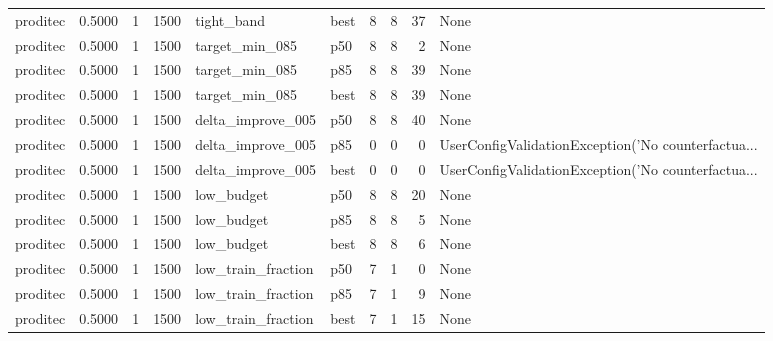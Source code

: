 \begin{tabular}{lrrrllrrrl}
proditec &    0.5000 &    1 &   1500 &           tight\_band &   best &               8 &          8 &      37 &                                               None \\
proditec &    0.5000 &    1 &   1500 &       target\_min\_085 &    p50 &               8 &          8 &       2 &                                               None \\
proditec &    0.5000 &    1 &   1500 &       target\_min\_085 &    p85 &               8 &          8 &      39 &                                               None \\
proditec &    0.5000 &    1 &   1500 &       target\_min\_085 &   best &               8 &          8 &      39 &                                               None \\
proditec &    0.5000 &    1 &   1500 &    delta\_improve\_005 &    p50 &               8 &          8 &      40 &                                               None \\
proditec &    0.5000 &    1 &   1500 &    delta\_improve\_005 &    p85 &               0 &          0 &       0 & UserConfigValidationException('No counterfactua... \\
proditec &    0.5000 &    1 &   1500 &    delta\_improve\_005 &   best &               0 &          0 &       0 & UserConfigValidationException('No counterfactua... \\
proditec &    0.5000 &    1 &   1500 &           low\_budget &    p50 &               8 &          8 &      20 &                                               None \\
proditec &    0.5000 &    1 &   1500 &           low\_budget &    p85 &               8 &          8 &       5 &                                               None \\
proditec &    0.5000 &    1 &   1500 &           low\_budget &   best &               8 &          8 &       6 &                                               None \\
proditec &    0.5000 &    1 &   1500 &   low\_train\_fraction &    p50 &               7 &          1 &       0 &                                               None \\
proditec &    0.5000 &    1 &   1500 &   low\_train\_fraction &    p85 &               7 &          1 &       9 &                                               None \\
proditec &    0.5000 &    1 &   1500 &   low\_train\_fraction &   best &               7 &          1 &      15 &                                               None \\

\end{tabular}
